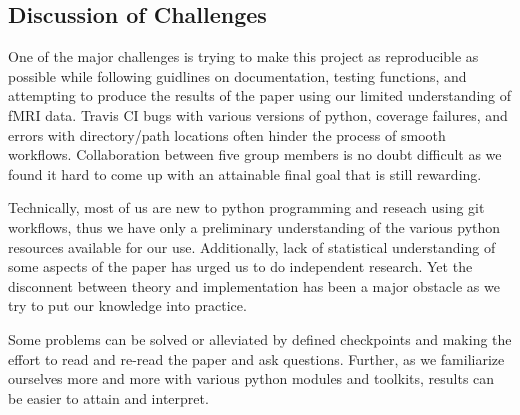 \subsection{Discussion of Challenges}

\par \indent One of the major challenges is trying to make this project as 
reproducible as possible while following guidlines on documentation, testing 
functions, and attempting to produce the results of the paper using our limited
understanding of fMRI data. Travis CI bugs with various versions of python, 
coverage failures, and errors with directory/path locations often hinder the 
process of smooth workflows. Collaboration between five group members is no 
doubt difficult as we found it hard to come up with an attainable final goal 
that is still rewarding. 
\par Technically, most of us are new to python programming and reseach using 
git workflows, thus we have only a preliminary understanding of the various 
python resources available for our use. Additionally, lack of statistical 
understanding of some aspects of the paper has urged us to do independent 
research. Yet the disconnent between theory and implementation has been a major 
obstacle as we try to put our knowledge into practice. 
\par Some problems can be solved or alleviated by defined checkpoints and making
the effort to read and re-read the paper and ask questions. Further, as we 
familiarize ourselves more and more  with various python modules and toolkits, 
results can be easier to attain and interpret.
